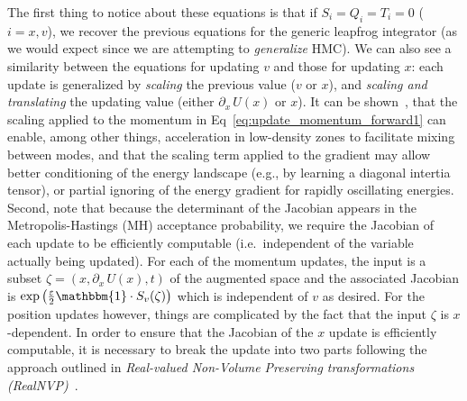 \documentclass[../main.tex]{subfiles}
\begin{document}
The first thing to notice about these equations is that if $S_{i} = Q_{i} = T_{i} = 0$ ($i = x, v$), we recover the
previous equations for the generic leapfrog integrator (as we would expect since we are attempting to
\emph{generalize} HMC).
%
We can also see a similarity between the equations for updating $v$ and those for updating $x$: each update is
generalized by \emph{scaling} the previous value ($v$ or $x$), and \emph{scaling and translating} the updating
value (either $\partial_{x}\,U(x)$ or $x$).
%
It can be shown~\cite{2017arXiv171109268L}, that the scaling applied to the momentum in
Eq~\ref{eq:update_momentum_forward1} can enable, among other things, acceleration in low-density zones to facilitate
mixing between modes, and that the scaling term applied to the gradient may allow better conditioning of the energy
landscape (e.g., by learning a diagonal intertia tensor), or partial ignoring of the energy gradient for rapidly
oscillating energies.
%
Second, note that because the determinant of the Jacobian appears in the Metropolis-Hastings (MH) acceptance
probability, we require the Jacobian of each update to be efficiently computable (i.e.\ independent of the variable
actually being updated).
%
For each of the momentum updates, the input is a subset $\zeta = (x, \partial_{x}\,U(x), t)$ of the augmented space and
the associated Jacobian is $\exp{\left(\frac{\eps}{2}\mathbbm{1}\cdot S_{v}(\zeta)\right)}$ which is independent of $v$
as desired.
%
For the position updates however, things are complicated by the fact that the input $\zeta$ is $x$-dependent.
%
In order to ensure that the Jacobian of the $x$ update is efficiently computable, it is necessary to break the update
into two parts following the approach outlined in \emph{Real-valued Non-Volume Preserving transformations
(RealNVP)}~\cite{dinhRealNVP}.

%
\end{document}

